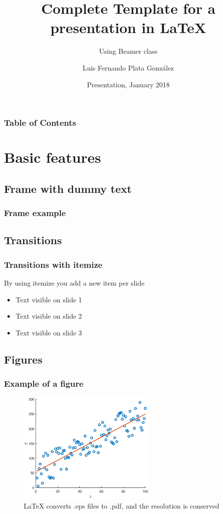 \documentclass[12pt]{beamer}
\title[Beamer Template] %
{Complete Template for a presentation in LaTeX}
\subtitle{Using Beamer class}
\author[Plata]
{Luis Fernando Plata González\inst{1}}
\institute[TEC] %
{
  \inst{1}%
  Computer Science Department\\
  Tecnológico de Monterrey
}
\date[2018] %
{Presentation, January 2018}
\begin{document}
\frame{\titlepage}

\begin{frame}
\frametitle{Table of Contents}
\tableofcontents
\end{frame}

\section{Basic features}
\subsection{Frame with dummy text}
\begin{frame}
\frametitle{Frame example}
\blindtext[1]
\end{frame}


\subsection{Transitions}
\begin{frame}
\frametitle{Transitions with itemize}
By using itemize you add a new item per slide
 
\begin{itemize}
 \item<1-> Text visible on slide 1
 \item<2-> Text visible on slide 2
 \item<3-> Text visible on slide 3
\end{itemize}
\end{frame}

\subsection{Figures}
\begin{frame}
\frametitle{Example of a figure}
\begin{figure}[h]
	\centering
	\includegraphics[width=0.6\textwidth]{imgs/r_result.eps}
	\caption{LaTeX converts .eps files to .pdf, and the resolution is conserved}
	\label{fig:1}
\end{figure}
\end{frame}
\end{document}
